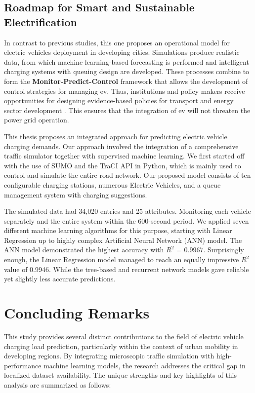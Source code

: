 \documentclass{thesis-library}
\begin{document}
{\subsection{Roadmap for Smart and Sustainable Electrification}

In contrast to previous studies, this one proposes an operational model for electric vehicles deployment in developing cities. Simulations produce realistic data, from which machine learning-based forecasting is performed and intelligent charging systems with queuing design are developed. These processes combine to form the \textbf{Monitor-Predict-Control} framework that allows the development of control strategies for managing \Gls{ev}. Thus, institutions and policy makers receive opportunities for designing evidence-based policies for transport and energy sector development \cite{ev_growth2025}. This ensures that the integration of \Gls{ev} will not threaten the power grid operation.


This thesis proposes an integrated approach for predicting electric vehicle charging demands. Our approach involved the integration of a comprehensive traffic simulator together with supervised machine learning. We first started off with the use of SUMO and the TraCI API in Python, which is mainly used to control and simulate the entire road network.
Our proposed model consists of ten configurable charging stations, numerous Electric Vehicles, and a queue management system with charging suggestions.

The simulated data had 34,020 entries and 25 attributes. Monitoring each vehicle separately and the entire system within the 600-second period. We applied seven different machine learning algorithms for this purpose, starting with Linear Regression up to highly complex Artificial Neural Network (ANN) model. The ANN model demonstrated the highest accuracy with $R^2$ = 0.9967. Surprisingly enough, the Linear Regression model managed to reach an equally impressive $R^2$ value of 0.9946. While the tree-based and recurrent network models gave reliable yet slightly less accurate predictions.


\section{Concluding Remarks}
\noindent This study provides several distinct contributions to the field of electric vehicle charging load prediction, particularly within the context of urban mobility in developing regions. By integrating microscopic traffic simulation with high-performance machine learning models, the research addresses the critical gap in localized dataset availability. The unique strengths and key highlights of this analysis are summarized as follows:

}
\end{document}

